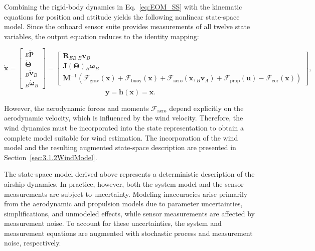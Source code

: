 Combining the rigid-body dynamics in Eq.~\eqref{eq:EOM_SS} with the kinematic equations for position and attitude yields the following nonlinear state-space model. Since the onboard sensor suite provides measurements of all twelve state variables, the output equation reduces to the identity mapping:

\begin{equation}
	\dot{\bm{x}}
	=
	\begin{bmatrix}
		{}_E \dot{\bm{p}} \\
		\dot{\bm{\Theta}} \\
		{}_B \dot{\bm{v}}_B \\
		{}_B \dot{\bm{\omega}}_B
	\end{bmatrix}
	=
	\begin{bmatrix}
		\bm{R}_{EB} \, {}_B\bm{v}_B \\[6pt]
		\bm{J}(\bm{\Theta}) {}_B \bm{\omega}_B \\[6pt]
		\bm{M}^{-1} \left( 	\bm{\mathcal{F}}_\mathrm{grav}(\bm{x}) 
		+ 
		\bm{\mathcal{F}}_\mathrm{buoy}(\bm{x}) 
		+ 
		\bm{\mathcal{F}}_\mathrm{aero}(\bm{x}, {}_B \bm{v}_A) 
		+ 
		\bm{\mathcal{F}}_\mathrm{prop}(\bm{u})
		- 
		\bm{\mathcal{F}}_\mathrm{cor}(\bm{x}) \right)
	\end{bmatrix},
	\label{eq:StateSpaceModel}
\end{equation}
\begin{equation}
	\bm{y} = \bm{h}(\bm{x}) = \bm{x}.
\end{equation}

However, the aerodynamic forces and moments $\bm{\mathcal{F}}_\mathrm{aero}$ depend explicitly on the aerodynamic velocity, which is influenced by the wind velocity. Therefore, the wind dynamics must be incorporated into the state representation to obtain a complete model suitable for wind estimation.
The incorporation of the wind model and the resulting augmented state-space description are presented in  Section~\ref{sec:3.1.2WindModel}.

The state-space model derived above represents a deterministic description of the airship dynamics. In practice, however, both the system model and the sensor measurements are subject to uncertainty. Modeling inaccuracies arise primarily from the aerodynamic and propulsion models due to parameter uncertainties, simplifications, and unmodeled effects, while sensor measurements are affected by measurement noise. To account for these uncertainties, the system and measurement equations are augmented with stochastic process and measurement noise, respectively.

